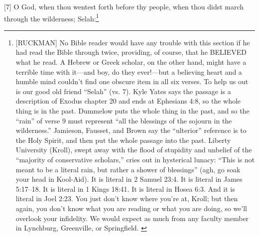 [7] \textcolor[rgb]{0.00,0.00,1.00}{O God, when thou wentest forth before thy people, when thou didst march through the wilderness; Selah:}\footnote{[RUCKMAN] No Bible reader would have any trouble with this section if he had read the Bible through twice, providing, of course, that he BELIEVED what he read. A Hebrew or Greek scholar, on the other hand, might have a terrible time with it—and boy, do they ever!—but a believing heart and a humble mind couldn’t find one obscure item in all six verses. To help us out is our good old friend “Selah” (vs. 7). Kyle Yates says the passage is a description of Exodus chapter 20 and ends at Ephesians 4:8, so the whole thing is in the past. Dummelow puts the whole thing in the past, and so the “rain” of verse 9 must represent “all the blessings of the sojourn in the wilderness.” Jamieson, Fausset, and Brown say the “ulterior” reference is to the Holy Spirit, and then put the whole passage into the past. Liberty University (Kroll), swept away with the flood of stupidity and unbelief of the “majority of conservative scholars,” cries out in hysterical lunacy: “This is not meant to be a literal rain, but rather a shower of blessings” (agh, go soak your head in Kool-Aid). It is literal in 2 Samuel 23:4. It is literal in James 5:17–18. It is literal in 1 Kings 18:41. It is literal in Hosea 6:3. And it is literal in Joel 2:23. You just don’t know where you’re at, Kroll; but then again, you don’t know what you are reading or what you are doing, so we’ll overlook your infidelity. We would expect as much from any faculty member in Lynchburg, Greenville, or Springfield.   \cite{Ruckman1992Psalms}  }
